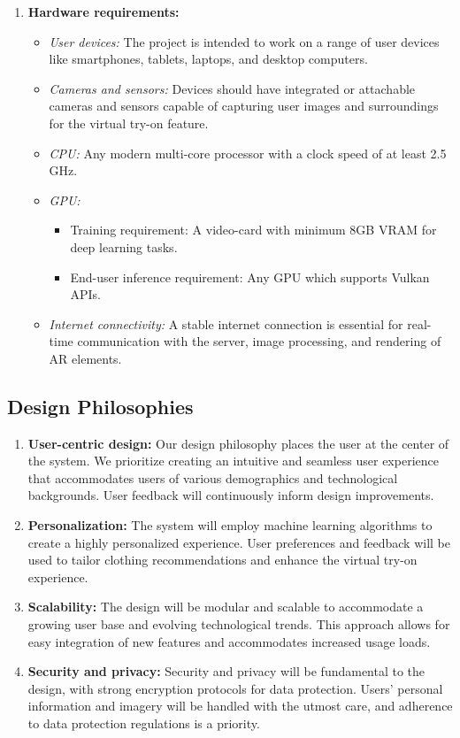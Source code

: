 \begin{enumerate}
\begin{itemize}
				\end{itemize}
			\item \textbf{Hardware requirements:}
			\begin{itemize}
				\item \textit{User devices:} The project is intended to work on a range of user devices like smartphones, tablets, laptops, and desktop computers.
				\item \textit{Cameras and sensors:} Devices should have integrated or attachable cameras and sensors capable of capturing user images and surroundings for the virtual try-on feature.
				\item \textit{CPU:} Any modern multi-core processor with a clock speed of at least 2.5 GHz.
				\item \textit{GPU:}
					\begin{itemize}
						\item Training requirement: A video-card with minimum 8GB VRAM for deep learning tasks.
						\item End-user inference requirement: Any GPU which supports Vulkan APIs.
					\end{itemize}
				\item \textit{Internet connectivity:} A stable internet connection is essential for real-time communication with the server, image processing, and rendering of AR elements.
			\end{itemize}
		\end{enumerate}
	
	\subsection{Design Philosophies}
		\begin{enumerate}
			\item \textbf{User-centric design:} Our design philosophy places the user at the center of the system. We prioritize creating an intuitive and seamless user experience that accommodates users of various demographics and technological backgrounds. User feedback will continuously inform design improvements.
			\item \textbf{Personalization:} The system will employ machine learning algorithms to create a highly personalized experience. User preferences and feedback will be used to tailor clothing recommendations and enhance the virtual try-on experience.
			\item \textbf{Scalability:} The design will be modular and scalable to accommodate a growing user base and evolving technological trends. This approach allows for easy integration of new features and accommodates increased usage loads.
			\item \textbf{Security and privacy:} Security and privacy will be fundamental to the design, with strong encryption protocols for data protection. Users' personal information and imagery will be handled with the utmost care, and adherence to data protection regulations is a priority.
		\end{enumerate}

